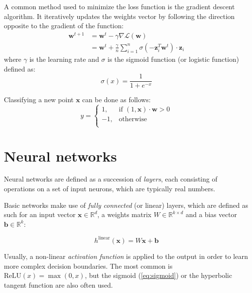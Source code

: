 \documentclass[a4paper,11pt,oneside]{report}
\begin{document}
A common method used to minimize the loss function is the gradient descent algorithm. It iteratively updates the weights vector by following the direction opposite to the gradient of the function:
\begin{align}\label{eq:gradient_descent}
    \mathbf{w}^{t+1} & = \mathbf{w}^t - \gamma\nabla\mathcal{L}(\mathbf{w}) \nonumber \\ 
    & = \mathbf{w}^t + \frac{\gamma}{n} \sum_{i=1}^{n} \sigma(-\mathbf{z}_i^T \mathbf{w}^t) \cdot \mathbf{z}_i
\end{align}
where $\gamma$ is the learning rate and $\sigma$ is the sigmoid function (or logistic function) defined as:
\begin{equation}\label{eq:sigmoid}
    \sigma(x) = \frac{1}{1 + e^{-x}}
\end{equation}

Classifying a new point $\mathbf{x}$ can be done as follows:
\begin{equation}\label{eq:logistic_reg_pred}
    y = 
    \begin{cases}
        1, & \text{if } (1, \mathbf{x}) \cdot \mathbf{w} > 0 \\
        -1, & \text{otherwise} \\
    \end{cases}
\end{equation}

\section{Neural networks}

Neural networks are defined as a succession of \emph{layers}, each consisting of operations on a set of input neurons, which are typically real numbers.

Basic networks make use of \emph{fully connected} (or linear) layers, which are defined as such for an input vector $\mathbf{x} \in \mathbb{R}^d$, a weights matrix $W \in \mathbb{R}^{k \times d}$ and a bias vector $\mathbf{b} \in \mathbb{R}^k$:

\begin{equation}\label{eq:linear_layer}
    h^{\mathrm{linear}}(\mathbf{x}) = W \mathbf{x} + \mathbf{b}
\end{equation}

Usually, a non-linear \emph{activation function} is applied to the output in order to learn more complex decision boundaries. The most common is $\mathrm{ReLU}(x) = \max(0, x)$, but the sigmoid (\autoref{eq:sigmoid}) or the hyperbolic tangent function are also often used.
\end{document}
